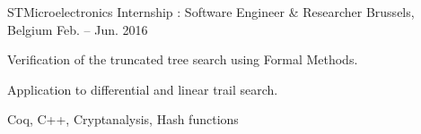 \begin{cventries}
	\cventrysix%
	{STMicroelectronics} %
	{Internship : Software Engineer \& Researcher} %
	{Brussels, Belgium} %
	{Feb. -- Jun. 2016} %
	{
		\begin{cvitems} %
			\item {Verification of the truncated tree search using Formal Methods.} %
			\item {Application to differential and linear trail search.} %
		\end{cvitems}
	}%
	{Coq, C++, Cryptanalysis, Hash functions}%









\end{cventries}
